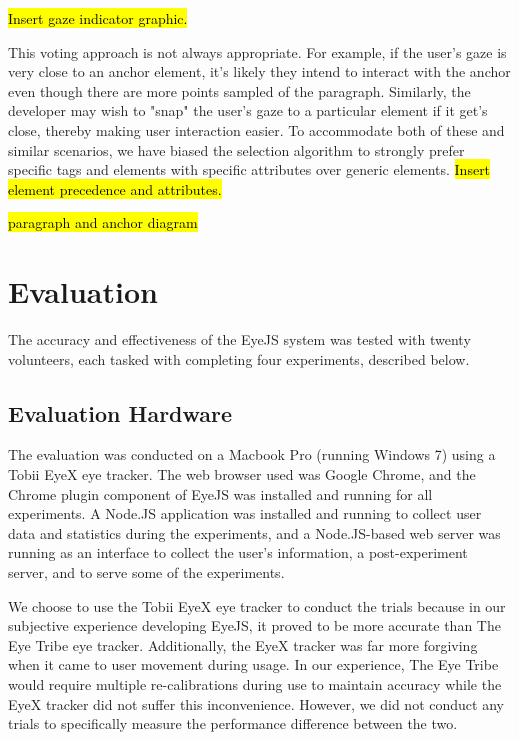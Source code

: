 \documentclass{sigchi}
\begin{document}
\hl{Insert gaze indicator graphic.}

This voting approach is not always appropriate. For example, if the
user's gaze is very close to an anchor element, it's likely they 
intend to interact with the anchor even though there are more points 
sampled of the paragraph. Similarly, the developer may wish to "snap"
the user's gaze to a particular element if it get's close, thereby 
making user interaction easier. To accommodate both of these and 
similar scenarios, we have biased the selection algorithm to strongly 
prefer specific tags and elements with specific attributes over generic
elements. \hl{Insert element precedence and attributes.}

\hl{paragraph and anchor diagram}



\section{Evaluation}
The accuracy and effectiveness of the EyeJS system was tested with 
twenty volunteers, each tasked with completing four experiments,
described below.


\subsection{Evaluation Hardware}
The evaluation was conducted on a Macbook Pro (running Windows 7) 
using a Tobii EyeX eye tracker. The web browser used was Google Chrome,
and the Chrome plugin component of EyeJS was installed and running for
all experiments. A Node.JS application was installed
and running to collect user data and statistics during the 
experiments, and a Node.JS-based web server was running as an interface
to collect the user's information, a post-experiment server, and to
serve some of the experiments.

We choose to use the Tobii EyeX eye tracker to conduct the trials
because in our subjective experience developing EyeJS, it proved to 
be more accurate than The Eye Tribe eye tracker. Additionally, the 
EyeX tracker was far more forgiving when it came to user movement
during usage. In our experience, The Eye Tribe would require multiple 
re-calibrations during use to maintain accuracy while the EyeX 
tracker did not suffer this inconvenience. However, we did 
not conduct any trials to specifically measure the performance 
difference between the two.
\end{document}
